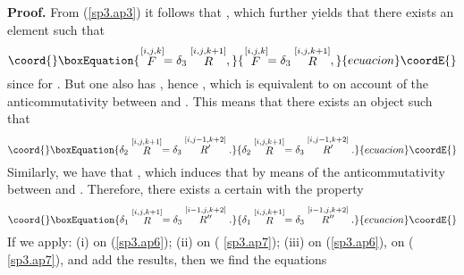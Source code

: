 \documentclass[a4paper,12pt]{article}
\begin{document}
{\textbf{Proof.}} From (\ref{sp3.ap3}) it follows that \coordHE{}, which further yields that there exists an element \coordHE{} such that 
\begin{equation}\coord{}\boxEquation{
\stackrel{\lbrack i,j,k]}{F}=\delta _{3}\stackrel{[i,j,k+1]}{R},
\label{sp3.ap5}
}{
\stackrel{\lbrack i,j,k]}{F}=\delta _{3}\stackrel{[i,j,k+1]}{R},
}{ecuacion}\coordE{}\end{equation}
since \coordHE{} for \coordHE{}. But one also
has \coordHE{}, hence \coordHE{}, which is equivalent to \coordHE{} on account of the anticommutativity
between \coordHE{} and \coordHE{}. This means that there exists an
object \coordHE{} such that 
\begin{equation}\coord{}\boxEquation{
\delta _{2}\stackrel{[i,j,k+1]}{R}=\delta _{3}\stackrel{[i,j-1,k+2]}{
R^{\prime }}.  \label{sp3.ap6}
}{
\delta _{2}\stackrel{[i,j,k+1]}{R}=\delta _{3}\stackrel{[i,j-1,k+2]}{
R^{\prime }}.  }{ecuacion}\coordE{}\end{equation}
Similarly, we have that \coordHE{}, which induces
that \coordHE{} by
means of the anticommutativity between \coordHE{} and \coordHE{}.
Therefore, there exists a certain \coordHE{} with the property 
\begin{equation}\coord{}\boxEquation{
\delta _{1}\stackrel{[i,j,k+1]}{R}=\delta _{3}\stackrel{[i-1,j,k+2]}{
R^{\prime \prime }}.  \label{sp3.ap7}
}{
\delta _{1}\stackrel{[i,j,k+1]}{R}=\delta _{3}\stackrel{[i-1,j,k+2]}{
R^{\prime \prime }}.  }{ecuacion}\coordE{}\end{equation}
If we apply: (i) \coordHE{} on (\ref{sp3.ap6}); (ii) \coordHE{} on (%
\ref{sp3.ap7}); (iii) \coordHE{} on (\ref{sp3.ap6}), \coordHE{} on (%
\ref{sp3.ap7}), and add the results, then we find the equations 
\end{document}
